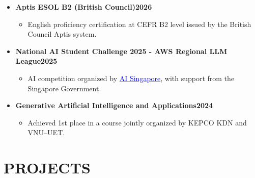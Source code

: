 \documentclass[11pt,a4paper]{article}
\newcommand{\smaller}{\small}
\newcommand{\heading}[2]{
  \noindent#1\hfill{\color{cvtextgray}#2}\\
}
\newcommand{\headingBf}[2]{
  \heading{\textbf{#1}}{\textbf{#2}}
}
\begin{document}
\begin{itemize}[label={\smaller$\bullet$}]

    \item \headingBf{Aptis ESOL B2 (British Council)}{2026}
    \begin{itemize}[label={\smaller$\diamond$}]
        \item English proficiency certification at CEFR B2 level issued by the British Council Aptis system.
    \end{itemize}

    \item \headingBf{National AI Student Challenge 2025 - AWS Regional LLM League}{2025}
    \begin{itemize}[label={\smaller$\diamond$}]
        \item AI competition organized by \href{https://certificates.aisingapore.org/certificate-verification/36D9BC9-36D9BC4-35E0C2E/}{\textcolor{blue}{AI Singapore}}, with support from the Singapore Government.
    \end{itemize}

    \item \headingBf{Generative Artificial Intelligence and Applications}{2024}
    \begin{itemize}[label={\smaller$\diamond$}]
        \item Achieved 1st place in a course jointly organized by KEPCO KDN and VNU–UET.
    \end{itemize}

\end{itemize}


 \section{PROJECTS}
\end{document}
